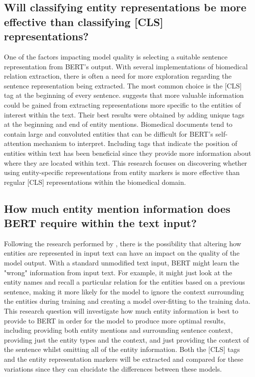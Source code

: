 \documentclass{l4proj}
\begin{document}
\subsection{Will classifying entity representations be more effective than classifying [CLS] representations?}

One of the factors impacting model quality is selecting a suitable sentence representation from BERT's output. With several implementations of biomedical relation extraction, there is often a need for more exploration regarding the sentence representation being extracted. The most common choice is the [CLS] tag at the beginning of every sentence. \cite{architectures} suggests that more valuable information could be gained from extracting representations more specific to the entities of interest within the text. Their best results were obtained by adding unique tags at the beginning and end of entity mentions. Biomedical documents tend to contain large and convoluted entities that can be difficult for BERT's self-attention mechanism to interpret. Including tags that indicate the position of entities within text has been beneficial since they provide more information about where they are located within text. This research focuses on discovering whether using entity-specific representations from entity markers is more effective than regular [CLS] representations within the biomedical domain.  

\subsection{How much entity mention information does BERT require within the text input?}

Following the research performed by \cite{mask}, there is the possibility that altering how entities are represented in input text can have an impact on the quality of the model output. With a standard unmodified text input, BERT might learn the "wrong" information from input text. For example, it might just look at the entity names and recall a particular relation for the entities based on a previous sentence, making it more likely for the model to ignore the context surrounding the entities during training and creating a model over-fitting to the training data. This research question will investigate how much entity information is best to provide to BERT in order for the model to produce more optimal results, including providing both entity mentions and surrounding sentence context, providing just the entity types and the context, and just providing the context of the sentence whilst omitting all of the entity information. Both the [CLS] tags and the entity representation markers will be extracted and compared for these variations since they can elucidate the differences between these models. 
\end{document}
